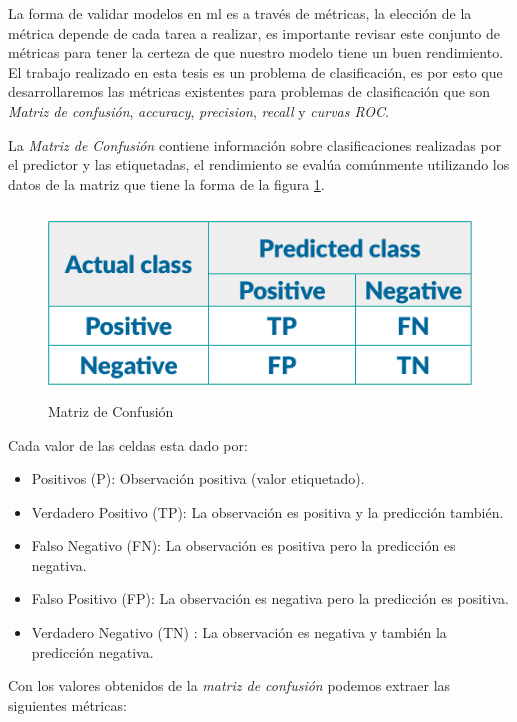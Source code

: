 La forma de validar modelos en \ac{ml} es a través de métricas, la elección de la métrica depende de cada tarea a realizar, es importante revisar este conjunto de métricas para tener la certeza de que nuestro modelo tiene un buen rendimiento. El trabajo realizado en esta tesis es un problema de clasificación, es por esto que desarrollaremos las métricas existentes para problemas de clasificación que son \textit{Matriz de confusión}, \textit{accuracy}, \textit{precision}, \textit{recall} y \textit{curvas ROC}.

La \textit{Matriz de Confusión} contiene información sobre clasificaciones realizadas por el predictor y las etiquetadas, el rendimiento  se evalúa comúnmente utilizando los datos de la matriz que tiene la forma de la figura \ref{Fig: confusion-matrix}.


\begin{figure}[H]
 \centering
  \includegraphics[height=5cm,keepaspectratio=true,clip=true]{imagenes/MarcoTeorico/confussion_matrix.png}
  \caption{Matriz de Confusión}
	\label{Fig: confusion-matrix}
\end{figure}

Cada valor de las celdas esta dado por:
\begin{itemize}
	\item Positivos (P): Observación positiva (valor etiquetado).
	\item Verdadero Positivo (TP): La observación es positiva y la predicción también.
	\item Falso Negativo (FN): La observación es positiva pero la predicción es negativa.
	\item Falso Positivo (FP): La observación es negativa pero la predicción es positiva.
	\item Verdadero Negativo (TN) :  La observación es negativa y también la predicción negativa.
\end{itemize}

Con los valores obtenidos de la \textit{matriz de confusión} podemos extraer las siguientes métricas:

